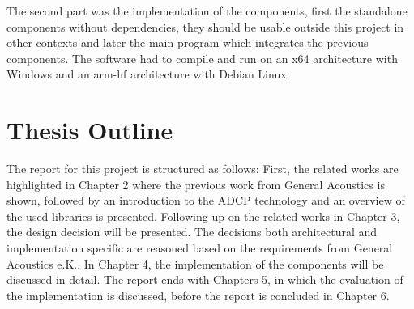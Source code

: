 The second part was the implementation of the components, first the standalone components without dependencies, they should be usable outside this project in other contexts and later the main program which integrates the previous components. The software had to compile and run on an x64 architecture with Windows and an arm-hf architecture with Debian Linux.

\section{Thesis Outline}
The report for this project is structured as follows: First, the related works are highlighted in Chapter 2 where the previous work from General Acoustics is shown, followed by an introduction to the ADCP technology and an overview of the used libraries is presented. Following up on the related works in Chapter 3, the design decision will be presented. The decisions both architectural and implementation specific are reasoned based on the requirements from General Acoustics e.K.. In Chapter 4, the implementation of the components will be discussed in detail. The report ends with Chapters 5, in which the evaluation of the implementation is discussed, before the report is concluded in Chapter 6.
